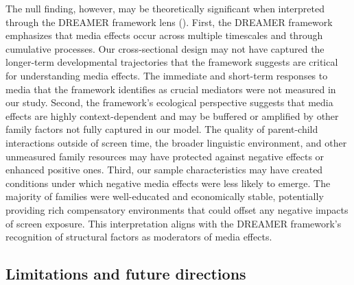 \documentclass[
  man,
  floatsintext,
  longtable,
  nolmodern,
  notxfonts,
  notimes,
  colorlinks=true,linkcolor=blue,citecolor=blue,urlcolor=blue]{apa7}
\begin{document}
The null finding, however, may be theoretically significant when
interpreted through the DREAMER framework lens
().
First, the DREAMER framework emphasizes that media effects occur across
multiple timescales and through cumulative processes. Our
cross-sectional design may not have captured the longer-term
developmental trajectories that the framework suggests are critical for
understanding media effects. The immediate and short-term responses to
media that the framework identifies as crucial mediators were not
measured in our study. Second, the framework's ecological perspective
suggests that media effects are highly context-dependent and may be
buffered or amplified by other family factors not fully captured in our
model. The quality of parent-child interactions outside of screen time,
the broader linguistic environment, and other unmeasured family
resources may have protected against negative effects or enhanced
positive ones. Third, our sample characteristics may have created
conditions under which negative media effects were less likely to
emerge. The majority of families were well-educated and economically
stable, potentially providing rich compensatory environments that could
offset any negative impacts of screen exposure. This interpretation
aligns with the DREAMER framework's recognition of structural factors as
moderators of media effects.

\subsection{Limitations and future
directions}\label{limitations-and-future-directions}
\end{document}
